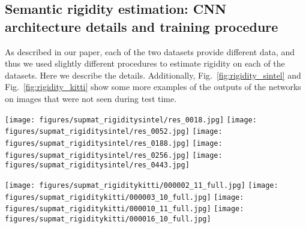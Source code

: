 \documentclass[10pt,twocolumn,letterpaper]{article}
\begin{document}
\subsection{Semantic rigidity estimation: CNN architecture details and training procedure}
\label{sec:cnndetails}
As described in our paper, each of the two datasets provide different data, and thus we used slightly different procedures to estimate rigidity on each of the datasets. Here we describe the details.
Additionally, Fig.~\ref{fig:rigidity_sintel} and Fig.~\ref{fig:rigidity_kitti} show some more examples of the outputs of the networks on images that were not seen during test time.

\begin{figure*}[t]
 \centerline{
 	\texttt{[image: figures/supmat\_rigiditysintel/res\_0018.jpg]}
 	\texttt{[image: figures/supmat\_rigiditysintel/res\_0052.jpg]}		
 	\texttt{[image: figures/supmat\_rigiditysintel/res\_0188.jpg]}		
 	\texttt{[image: figures/supmat\_rigiditysintel/res\_0256.jpg]}		
 	\texttt{[image: figures/supmat\_rigiditysintel/res\_0443.jpg]}		
 }
 \vspace{-0.05in}
 \caption{Results of rigidity estimation on the MPI-Sintel test set. Top: Original frame; Bottom: probability map of rigidity (white is likely rigid, black likely moving independently). }
 \label{fig:rigidity_sintel}
 \end{figure*}

\begin{figure*}[t]
 \centerline{
 	\texttt{[image: figures/supmat\_rigiditykitti/000002\_11\_full.jpg]}
 	\texttt{[image: figures/supmat\_rigiditykitti/000003\_10\_full.jpg]}		
 	\texttt{[image: figures/supmat\_rigiditykitti/000010\_11\_full.jpg]}		
 	\texttt{[image: figures/supmat\_rigiditykitti/000016\_10\_full.jpg]}	
 }
 \vspace{-0.1in}
 \caption{Results of rigidity estimation on KITTI 2015. Top: Original frame; Bottom: probability map of rigidity. }
 \label{fig:rigidity_kitti}
 \end{figure*}

  
\end{document}
